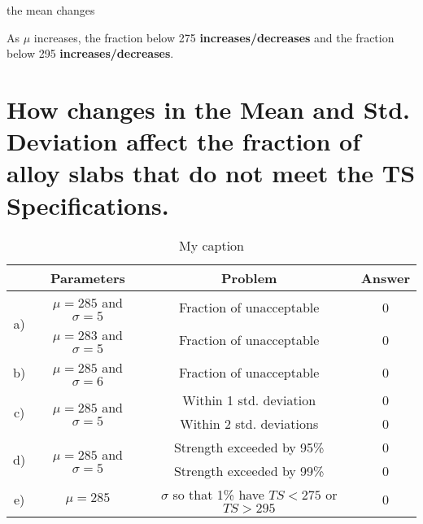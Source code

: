 \documentclass[letterpaper]{article}
\begin{document}
the mean changes

As $\mu$ increases, the fraction below 275 \textbf{increases/decreases}
and the fraction below 295 \textbf{increases/decreases}.


\section{How changes in the Mean and Std. Deviation affect the fraction of alloy slabs that do not meet the TS Specifications.} %

\begin{table}[H]
 \centering
 \begin{tabular}{c|c|c|c|}
                      & Parameters                                & Problem                                            & Answer \\ \hline
  \multirow{2}{*}{a)} & $\mu=285$ and $\sigma=5$                  & Fraction of unacceptable                           & 0      \\ \cline{2-4}
                      & $\mu=283$ and $\sigma=5$                  & Fraction of unacceptable                           & 0      \\ \hline
  b)                  & $\mu=285$ and $\sigma=6$                  & Fraction of unacceptable                           & 0      \\ \hline
  \multirow{2}{*}{c)} & \multirow{2}{*}{$\mu=285$ and $\sigma=5$} & Within 1 std. deviation                            & 0      \\ \cline{3-4}
                      &                                           & Within 2 std. deviations                           & 0      \\ \hline
  \multirow{2}{*}{d)} & \multirow{2}{*}{$\mu=285$ and $\sigma=5$} & Strength exceeded by 95\%                          & 0      \\ \cline{3-4}
                      &                                           & Strength exceeded by 99\%                          & 0      \\ \hline
  e)                  & $\mu=285$                                 & $\sigma$ so that 1\% have $TS < 275$ or $TS > 295$ & 0      \\ \hline
 \end{tabular}
 \caption{My caption}
 \label{my-label}
\end{table}
\end{document}
